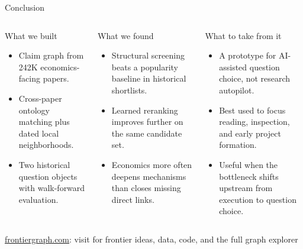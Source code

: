 \documentclass[aspectratio=169,10pt]{beamer}
\begin{document}
\begin{frame}{Conclusion}
\begin{columns}[T,totalwidth=0.95\textwidth]
\begin{block}{What we built}
{\small
\begin{itemize}
  \item Claim graph from 242K economics-facing papers.
  \item Cross-paper ontology matching plus dated local neighborhoods.
  \item Two historical question objects with walk-forward evaluation.
\end{itemize}
}
\end{block}

\begin{block}{What we found}
{\small
\begin{itemize}
  \item Structural screening beats a popularity baseline in historical shortlists.
  \item Learned reranking improves further on the same candidate set.
  \item Economics more often deepens mechanisms than closes missing direct links.
\end{itemize}
}
\end{block}

\begin{block}{What to take from it}
{\small
\begin{itemize}
  \item A prototype for AI-assisted question choice, not research autopilot.
  \item Best used to focus reading, inspection, and early project formation.
  \item Useful when the bottleneck shifts upstream from execution to question choice.
\end{itemize}
}
\end{block}
\end{columns}

\vspace{0.65em}
\begin{center}
{\small\color{DeckMuted}\href{https://frontiergraph.com}{\textcolor{DeckBlue}{frontiergraph.com}}: visit for frontier ideas, data, code, and the full graph explorer}
\end{center}
\end{frame}
\end{document}
